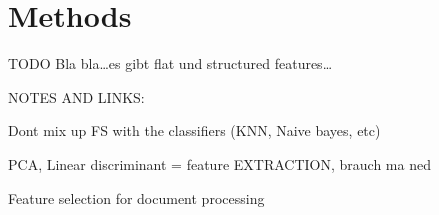 \section{Methods}
\label{sec:methods}


TODO
Bla bla\ldots es gibt flat und structured features\ldots





	
NOTES AND LINKS:

Dont mix up FS with the classifiers (KNN, Naive bayes, etc)

PCA, Linear discriminant = feature EXTRACTION, brauch ma ned

Feature selection for document processing 
